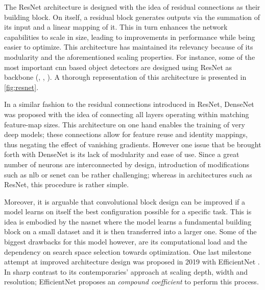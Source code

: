 

%
\noindent The ResNet architecture is designed with the idea of residual connections as their 
building block. On itself, a residual block generates outputs via the summation of its input and a 
linear mapping of it. This in turn enhances the network capabilities to scale in size, leading to 
improvements in performance while being easier to optimize. This architecture has maintained its 
relevancy because of its modularity and the aforementioned scaling properties. For instance, some 
of the most important \gls{cnn} based object detectors are designed using ResNet as backbone 
(\cite{ren2015faster}, \cite{lin2017focal}, \cite{he2017mask}). A thorough representation of this 
architecture is presented in \autoref{fig:resnet}. 

In a similar fashion to the residual connections introduced in ResNet, DenseNet 
\autocite{huang2017densely} was proposed with the idea of connecting all layers operating within 
matching feature-map sizes. This architecture on one hand enables the training of very deep 
models; these connections allow for feature reuse and identity mappings, thus negating the 
effect of vanishing gradients. However one issue that be brought forth with DenseNet is its 
lack of  modularity and ease of use. Since a great number of neurons are interconnected by design, 
introduction of modifications such as \gls{nlb}\autocite{wang2018non} or \gls{senet} 
\autocite{hu2018squeeze} can be  rather challenging; whereas in architectures such as ResNet, 
this procedure is rather simple.

Moreover, it is arguable that convolutional block design can be improved if a model learns on 
itself the best configuration possible for a specific task. This is idea is embodied by the 
\gls{nasnet} \autocite{zoph2018learning} where the model learns a fundamental building block on a 
small dataset and it is then transferred into a larger one. Some of the biggest drawbacks for this 
model however, are its computational load and the dependency on search space selection towards 
optimization. One last milestone attempt at improved architecture design was proposed in 2019 with 
EfficientNet \autocite{tan2019efficientnet}. In sharp contrast to its contemporaries' approach at 
scaling depth, width and resolution; EfficientNet proposes an \emph{compound coefficient} to 
perform this process.

